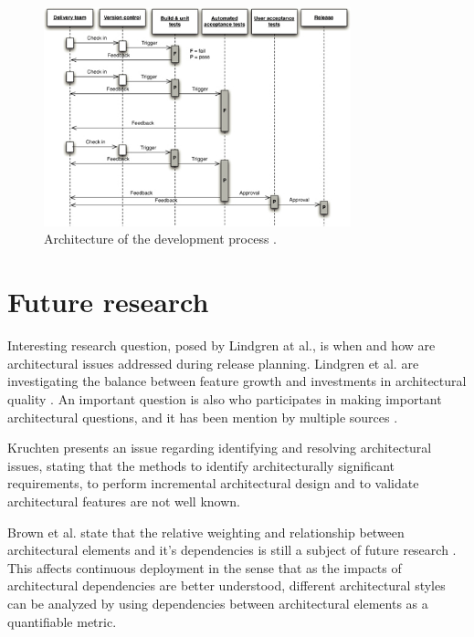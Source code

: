 \documentclass[conference]{IEEEtran}
\begin{document}
\begin{figure}[!t]
	\centering
	\includegraphics[width=3.5in]{developmentprocess.jpg}
	\caption{Architecture of the development process \cite{cdbook}.}
	\label{fig1}
\end{figure}

\section{Future research}

Interesting research question, posed by Lindgren at al., is when and how are architectural issues addressed during release planning. Lindgren et al. are investigating the balance between feature growth and investments in architectural quality \cite{lindgren2008importance}. An important question is also who participates in making important architectural questions, and it has been mention by multiple sources \cite{lindgren2008importance, kruchten2010software}.

Kruchten presents an issue regarding identifying and resolving architectural issues, stating that the methods to identify architecturally significant requirements, to perform incremental architectural design and to validate architectural features are not well known.

Brown et al. state that the relative weighting and relationship between architectural elements and it's dependencies is still a subject of future research \cite{brown2011analysis}. This affects continuous deployment in the sense that as the impacts of architectural dependencies are better understood, different architectural styles can be analyzed by using dependencies between architectural elements as a quantifiable metric. 


\end{document}

